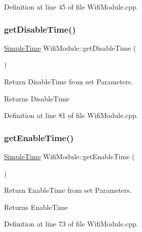 Definition at line 45 of file Wifi\+Module.\+cpp.

\mbox{\label{class_wifi_module_ae43e1f85630c40920fa87c12de0d8e1e}} 
\subsubsection{\texorpdfstring{getDisableTime()}{getDisableTime()}}
{\footnotesize\ttfamily \mbox{\hyperlink{class_simple_time}{Simple\+Time}} Wifi\+Module\+::get\+Disable\+Time (\begin{DoxyParamCaption}{ }\end{DoxyParamCaption})}



Return Disable\+Time from set Parameters. 

\begin{DoxyReturn}{Returns}
Disable\+Time 
\end{DoxyReturn}


Definition at line 81 of file Wifi\+Module.\+cpp.

\mbox{\label{class_wifi_module_a1082a8799fe84e825520a61ee048da46}} 
\subsubsection{\texorpdfstring{getEnableTime()}{getEnableTime()}}
{\footnotesize\ttfamily \mbox{\hyperlink{class_simple_time}{Simple\+Time}} Wifi\+Module\+::get\+Enable\+Time (\begin{DoxyParamCaption}{ }\end{DoxyParamCaption})}



Return Enable\+Time from set Parameters. 

\begin{DoxyReturn}{Returns}
Enable\+Time 
\end{DoxyReturn}


Definition at line 73 of file Wifi\+Module.\+cpp.

\mbox{\label{class_wifi_module_a0f9b83f8ed9714183df33e055323261f}} 
